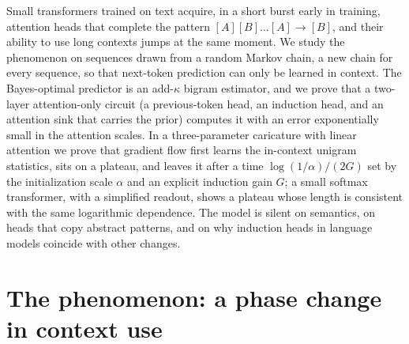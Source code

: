 \newcommand{\indcnt}{\nu}
\newcommand{\indpb}{p^{\mathrm{B}}}
\newcommand{\indAU}{A_{UU}}
\newcommand{\indAX}{A_{UB}}
\newcommand{\indAB}{A_{BB}}
\newcommand{\indLU}{\Loss_{U}}
\newcommand{\indDir}{\operatorname{Dir}}
\newcommand{\indH}{\mathrm{H}}

\begin{refsection}

\begin{chaptersummary}
Small transformers trained on text acquire, in a short burst early in training, attention heads that complete the pattern $[A][B]\dots[A]\to[B]$, and their ability to use long contexts jumps at the same moment. We study the phenomenon on sequences drawn from a random Markov chain, a new chain for every sequence, so that next-token prediction can only be learned in context. The Bayes-optimal predictor is an add-$\kappa$ bigram estimator, and we prove that a two-layer attention-only circuit (a previous-token head, an induction head, and an attention sink that carries the prior) computes it with an error exponentially small in the attention scales. In a three-parameter caricature with linear attention we prove that gradient flow first learns the in-context unigram statistics, sits on a plateau, and leaves it after a time $\log(1/\alpha)/(2G)$ set by the initialization scale $\alpha$ and an explicit induction gain $G$; a small softmax transformer, with a simplified readout, shows a plateau whose length is consistent with the same logarithmic dependence. The model is silent on semantics, on heads that copy abstract patterns, and on why induction heads in language models coincide with other changes.
\end{chaptersummary}

\section{The phenomenon: a phase change in context use}\label{sec:induction:phenomenon}


\end{refsection}
